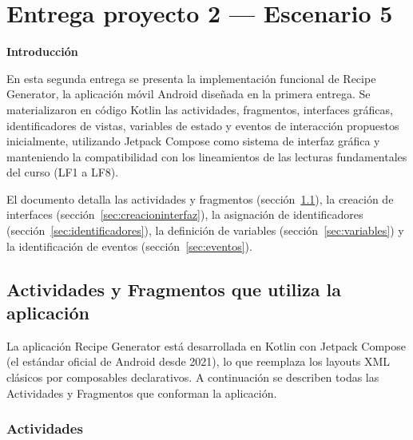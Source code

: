 \documentclass[stu, 12pt, letterpaper, donotrepeattitle, floatsintext, natbib]{apa7}
\begin{document}

\newpage
\section{Entrega proyecto 2 --- Escenario 5}

\begin{center}
\textbf{\large Introducción}
\end{center}

En esta segunda entrega se presenta la implementación funcional de Recipe Generator, la
aplicación móvil Android diseñada en la primera entrega. Se materializaron en código Kotlin
las actividades, fragmentos, interfaces gráficas, identificadores de vistas, variables de
estado y eventos de interacción propuestos inicialmente, utilizando Jetpack Compose como
sistema de interfaz gráfica y manteniendo la compatibilidad con los lineamientos de las
lecturas fundamentales del curso (LF1 a LF8).

El documento detalla las actividades y fragmentos
(sección~\ref{sec:actividadesfragmentos}), la creación de interfaces
(sección~\ref{sec:creacioninterfaz}), la asignación de identificadores
(sección~\ref{sec:identificadores}), la definición de variables
(sección~\ref{sec:variables}) y la identificación de eventos
(sección~\ref{sec:eventos}).

\newpage
\subsection{Actividades y Fragmentos que utiliza la aplicación}
\label{sec:actividadesfragmentos}

La aplicación Recipe Generator está desarrollada en Kotlin con Jetpack Compose (el
estándar oficial de Android desde 2021), lo que reemplaza los layouts XML clásicos por
composables declarativos. A continuación se describen todas las Actividades y Fragmentos
que conforman la aplicación.

\subsubsection{Actividades}
\end{document}
